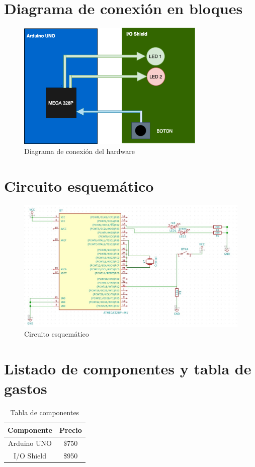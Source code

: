\section{Diagrama  de conexión en bloques}
\begin{figure}[H]
    \centering
    \includegraphics[width=9cm]{imagenes/TP4 Diagrama en bloques.png}
    \caption{Diagrama de conexión del hardware}
    \label{fig:conexion}
\end{figure}

\section{Circuito esquemático}

\begin{figure}[H]
    \centering
    \includegraphics[width=0.7\linewidth]{imagenes/Circuito.jpg}
    \caption{Circuito esquemático}
    \label{fig:esquematico}
\end{figure}

\section{Listado de componentes y tabla de gastos}

\begin{table}[H]
    
    \centering
    \begin{tabular}{|c||c|}
    \hline
    \textbf{Componente}  & \textbf{Precio} \\ \hline \hline
    Arduino UNO & \$750  \\ \hline
    I/O Shield  & \$950  \\ \hline
    \end{tabular}
    \caption{Tabla de componentes}
    
\end{table}




